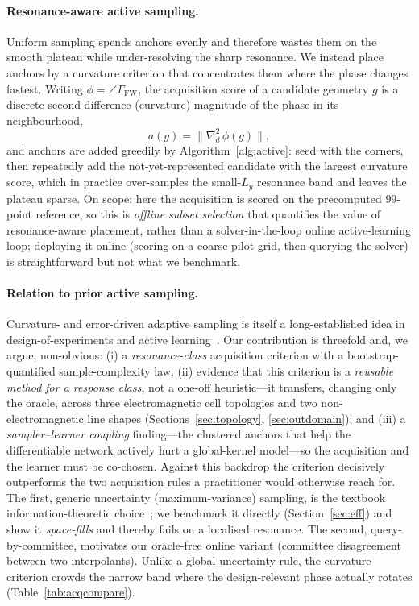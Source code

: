 \documentclass[11pt]{article}
\begin{document}
\paragraph{Resonance-aware active sampling.} Uniform sampling spends anchors evenly and therefore wastes
them on the smooth plateau while under-resolving the sharp resonance. We instead place anchors by a
curvature criterion that concentrates them where the phase changes fastest. Writing
$\phi=\angle\Gamma_\mathrm{FW}$, the acquisition score of a candidate geometry $g$ is a discrete
second-difference (curvature) magnitude of the phase in its neighbourhood,
\begin{equation}
a(g)=\big\lVert \nabla^2_{\!d}\,\phi(g)\big\rVert ,
\label{eq:acq}
\end{equation}
and anchors are added greedily by Algorithm~\ref{alg:active}: seed with the corners, then repeatedly add
the not-yet-represented candidate with the largest curvature score, which in practice over-samples the
small-$L_y$ resonance band and leaves the plateau sparse. On scope: here the
acquisition is scored on the precomputed $99$-point reference, so this is \emph{offline subset selection}
that quantifies the value of resonance-aware placement, rather than a solver-in-the-loop online
active-learning loop; deploying it online (scoring on a coarse pilot grid, then querying the solver) is
straightforward but not what we benchmark.

\paragraph{Relation to prior active sampling.} Curvature- and error-driven adaptive sampling is itself a
long-established idea in design-of-experiments and active
learning~\cite{settles2012,lookman2019,gramacy2020,sener2018}. Our
contribution is threefold and, we argue, non-obvious: (i) a \emph{resonance-class} acquisition criterion
with a bootstrap-quantified sample-complexity law; (ii) evidence that this criterion is a \emph{reusable
method for a response class}, not a one-off heuristic---it transfers, changing only the oracle, across three
electromagnetic cell topologies and two non-electromagnetic line shapes (Sections~\ref{sec:topology},
\ref{sec:outdomain}); and (iii) a \emph{sampler--learner coupling} finding---the clustered anchors that help
the differentiable network actively hurt a global-kernel model---so the acquisition and the learner must be
co-chosen. Against this backdrop the criterion decisively outperforms the two acquisition rules a
practitioner would otherwise reach for. The first, generic uncertainty (maximum-variance) sampling, is the textbook
information-theoretic choice~\cite{settles2012}; we benchmark it directly (Section~\ref{sec:eff}) and show it
\emph{space-fills} and thereby fails on a localised resonance. The second, query-by-committee, motivates our
oracle-free online variant (committee disagreement between two interpolants). Unlike a global uncertainty
rule, the curvature criterion crowds the narrow band where the design-relevant
phase actually rotates (Table~\ref{tab:acqcompare}).
\end{document}
